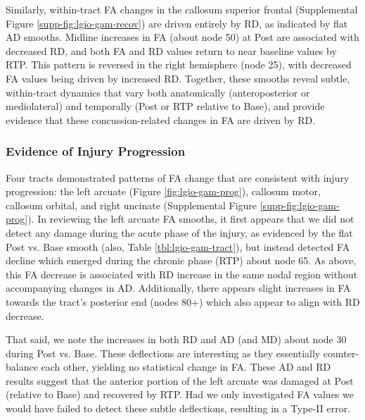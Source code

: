 \documentclass[12pt]{article}
\begin{document}
Similarly, within-tract FA changes in the callosum superior frontal (Supplemental Figure \ref{supp-fig:lgio-gam-recov}) are driven entirely by RD, as indicated by flat AD smooths. Midline increases in FA (about node 50) at Post are associated with decreased RD, and both FA and RD values return to near baseline values by RTP. This pattern is reversed in the right hemisphere (node 25), with decreased FA values being driven by increased RD. Together, these smooths reveal subtle, within-tract dynamics that vary both anatomically (anteroposterior or mediolateral) and temporally (Post or RTP relative to Base), and provide evidence that these concussion-related changes in FA are driven by RD.


\subsubsection{Evidence of Injury Progression}
\label{sssec:res-dwi-pat-prog}
Four tracts demonstrated patterns of FA change that are consistent with injury progression: the left arcuate (Figure \ref{fig:lgio-gam-prog}), callosum motor, callosum orbital, and right uncinate (Supplemental Figure \ref{supp-fig:lgio-gam-prog}). In reviewing the left arcuate FA smooths, it first appears that we did not detect any damage during the acute phase of the injury, as evidenced by the flat Post vs. Base smooth (also, Table \ref{tbl:lgio-gam-tract}), but instead detected FA decline which emerged during the chronic phase (RTP) about node 65. As above, this FA decrease is associated with RD increase in the same nodal region without accompanying changes in AD. Additionally, there appears slight increases in FA towards the tract's posterior end (nodes 80+) which also appear to align with RD decrease.

That said, we note the increases in both RD and AD (and MD) about node 30 during Post vs. Base. These deflections are interesting as they essentially counter-balance each other, yielding no statistical change in FA. These AD and RD results suggest that the anterior portion of the left arcuate was damaged at Post (relative to Base) and recovered by RTP. Had we only investigated FA values we would have failed to detect these subtle deflections, resulting in a Type-II error.
\end{document}
